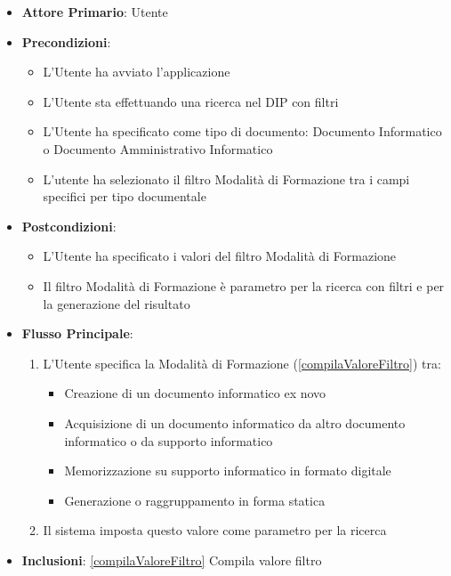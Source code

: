\begin{itemize}
      \item \textbf{Attore Primario}: Utente
      \item \textbf{Precondizioni}: 
      \begin{itemize}
            \item L'Utente ha avviato l'applicazione
            \item L'Utente sta effettuando una ricerca nel DIP con filtri
            \item L'Utente ha specificato come tipo di documento: Documento Informatico o Documento Amministrativo Informatico
            \item L'utente ha selezionato il filtro Modalità di Formazione tra i campi specifici per tipo documentale
      \end{itemize}
      \item \textbf{Postcondizioni}: 
      \begin{itemize}
            \item L'Utente ha specificato i valori del filtro Modalità di Formazione
            \item Il filtro Modalità di Formazione è parametro per la ricerca con filtri e per la generazione del risultato
      \end{itemize}
      \item \textbf{Flusso Principale}:
      \begin{enumerate}
            \item L'Utente specifica la Modalità di Formazione (\ref{compilaValoreFiltro}) tra:
            \begin{itemize}
                  \item Creazione di un documento informatico ex novo
                  \item Acquisizione di un documento informatico da altro documento informatico o da supporto informatico
                  \item Memorizzazione su supporto informatico in formato digitale
                  \item Generazione o raggruppamento in forma statica
            \end{itemize}
            \item Il sistema imposta questo valore come parametro per la ricerca
      \end{enumerate}
      \item \textbf{Inclusioni}: \ref{compilaValoreFiltro} Compila valore filtro
\end{itemize}

